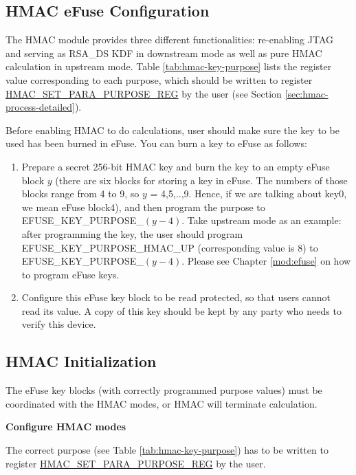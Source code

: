 \documentclass[main\_\_EN.tex]{subfiles}
\begin{document}
\subsection{HMAC eFuse Configuration}
\label{sec:hmac-config-function}

The HMAC module provides three different functionalities: re-enabling JTAG and serving as RSA\_DS KDF in downstream mode as well as pure HMAC calculation in upstream mode. Table \ref{tab:hmac-key-purpose} lists the register value corresponding to each purpose, which should be written to register \hyperref[regdesc:HMACSETPARAPURPOSEREG]{HMAC\_SET\_PARA\_PURPOSE\_REG} by the user (see Section \ref{sec:hmac-process-detailed}).

\clearpage


Before enabling HMAC to do calculations, user should make sure the key to be used has been burned in eFuse. You can burn a key to eFuse as follows:

\begin{enumerate}
    \item Prepare a secret 256-bit HMAC key and burn the key to an empty eFuse block $y$ (there are six blocks for storing a key in eFuse. The numbers of those blocks range from 4 to 9, so $y$ = 4,5,..,9. Hence, if we are talking about key0, we mean eFuse block4), and then program the purpose to EFUSE\_KEY\_PURPOSE\_$(y-4)$. Take upstream mode as an example: after programming the key, the user should program EFUSE\_KEY\_PURPOSE\_HMAC\_UP (corresponding value is 8) to EFUSE\_KEY\_PURPOSE\_$(y-4)$. Please see Chapter \ref{mod:efuse} \textit{} on how to program eFuse keys.
    \item Configure this eFuse key block to be read protected, so that users cannot read its value. A copy of this key should be kept by any party who needs to verify this device.
\end{enumerate}

\subsection{HMAC Initialization}

The eFuse key blocks (with correctly programmed purpose values) must be coordinated with the HMAC modes, or HMAC will terminate calculation.

\textbf{Configure HMAC modes}

The correct purpose (see Table \ref{tab:hmac-key-purpose}) has to be written to register \hyperref[regdesc:HMACSETPARAPURPOSEREG]{HMAC\_SET\_PARA\_PURPOSE\_REG} by the user.
\end{document}
